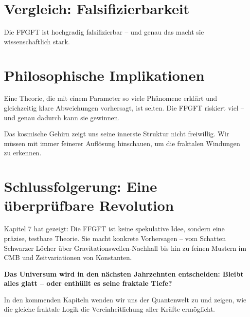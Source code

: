	\section{Vergleich: Falsifizierbarkeit}
\begin{center}
	\small
\end{center}
	
	Die FFGFT ist hochgradig falsifizierbar – und genau das macht sie wissenschaftlich stark.
	
	\section{Philosophische Implikationen}
	
	Eine Theorie, die mit einem Parameter so viele Phänomene erklärt und gleichzeitig klare Abweichungen vorhersagt, ist selten. Die FFGFT riskiert viel – und genau dadurch kann sie gewinnen.
	
	Das kosmische Gehirn zeigt uns seine innerste Struktur nicht freiwillig. Wir müssen mit immer feinerer Auflösung hinschauen, um die fraktalen Windungen zu erkennen.
	
	\section{Schlussfolgerung: Eine überprüfbare Revolution}
	
	Kapitel 7 hat gezeigt: Die FFGFT ist keine spekulative Idee, sondern eine präzise, testbare Theorie. Sie macht konkrete Vorhersagen – vom Schatten Schwarzer Löcher über Gravitationswellen-Nachhall bis hin zu feinen Mustern im CMB und Zeitvariationen von Konstanten.
	
	\textbf{Das Universum wird in den nächsten Jahrzehnten entscheiden: Bleibt alles glatt – oder enthüllt es seine fraktale Tiefe?}
	
	In den kommenden Kapiteln wenden wir uns der Quantenwelt zu und zeigen, wie die gleiche fraktale Logik die Vereinheitlichung aller Kräfte ermöglicht.




